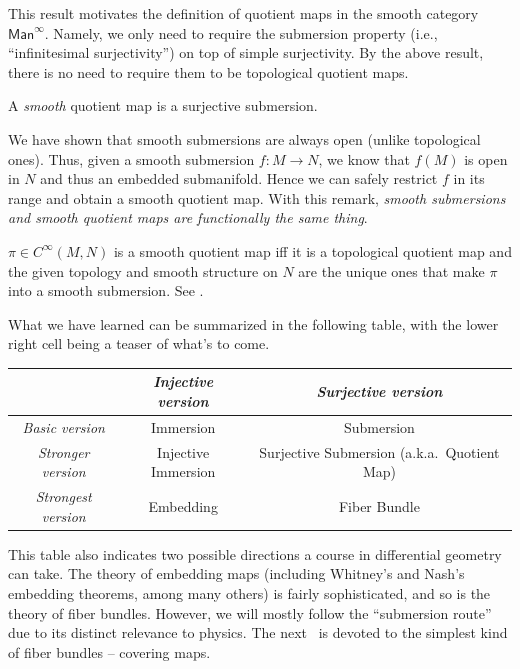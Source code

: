 This result motivates the definition of quotient maps in the smooth category $\mathsf{Man}^\infty$. Namely, we only need to require the submersion property (i.e., ``infinitesimal surjectivity'') on top of simple surjectivity. By the above result, there is no need to require them to be topological quotient maps.

\begin{defn}
    A \emph{smooth} quotient map is a surjective submersion.
\end{defn}

We have shown that smooth submersions are always open (unlike topological ones). Thus, given a smooth submersion $f:M\to N$, we know that $f(M)$ is open in $N$ and thus an embedded submanifold. Hence we can safely restrict $f$ in its range and obtain a smooth quotient map. With this remark, \emph{smooth submersions and smooth quotient maps are functionally the same thing}.

\begin{rem}
    $\pi\in C^\infty(M,N)$ is a smooth quotient map iff it is a topological quotient map and the given topology and smooth structure on $N$ are the unique ones that make $\pi$ into a smooth submersion. See \cite[Problems 4-7]{Lee}.
\end{rem}

What we have learned can be summarized in the following table, with the lower right cell being a teaser of what's to come.

\begin{center}
\begin{tabular}{ccc}
    & \emph{Injective version} & \emph{Surjective version} \\
    \toprule
    \emph{Basic version} & Immersion & Submersion  \\
    \midrule
    \emph{Stronger version}  & Injective Immersion & Surjective Submersion (a.k.a.~Quotient Map) \\
    \midrule
    \emph{Strongest version}  & Embedding & Fiber Bundle \\
    \bottomrule
\end{tabular}
\end{center}
 
 This table also indicates two possible directions a course in differential geometry can take. The theory of embedding maps (including Whitney's and Nash's embedding theorems, among many others) is fairly sophisticated, and so is the theory of fiber bundles. However, we will mostly follow the ``submersion route'' due to its distinct relevance to physics. The next \Chap\ is devoted to the simplest kind of fiber bundles -- covering maps.







